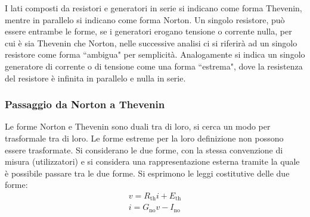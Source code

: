 \documentclass{article}
\numberwithin{equation}{subsection}
\begin{document}
I lati composti da resistori e generatori in serie si indicano come forma Thevenin, mentre in parallelo si indicano come forma Norton. Un singolo resistore, può essere 
entrambe le forme, se i generatori erogano tensione o corrente nulla, per cui è sia Thevenin che Norton, nelle successive analisi ci si riferirà ad un singolo resistore come 
forma ``ambigua" per semplicità. Analogamente si indica un singolo generatore di corrente o di tensione come una forma ``estrema", dove la resistenza del resistore è infinita in 
parallelo e nulla in serie. 

\begin{figure}[H]%
    \centering
    \qquad
    \label{fig:forme-thevenin-norton}
\end{figure}

\subsubsection{Passaggio da Norton a Thevenin}

Le forme Norton e Thevenin sono duali tra di loro, si cerca un modo per trasformale tra di loro. Le forme estreme per la loro definizione non possono essere trasformate. 
Si considerano le due forme, con la stessa convenzione di misura (utilizzatori) e si considera una rappresentazione esterna tramite la quale è possibile passare tra le due 
forme. 
Si esprimono le leggi costitutive delle due forme:
\begin{gather*}
    v=R_\mathrm{th}i+E_\mathrm{th}\\
    i=G_\mathrm{no}v-I_\mathrm{no}
\end{gather*}
\end{document}
